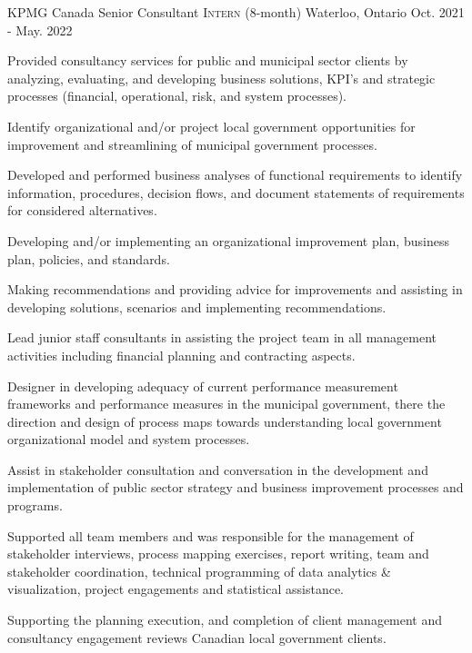 \begin{cventries}

  \cventry
    {KPMG Canada} %
    {Senior Consultant \textsc{Intern} (8-month)} %
    {Waterloo, Ontario } %
    {Oct. 2021 - May. 2022} %
    {
      \begin{cvitems} %
        \item Provided consultancy services for public and municipal sector clients by analyzing, evaluating, and developing business solutions, KPI’s and strategic processes (financial, operational, risk, and system processes).
        \item Identify organizational and/or project local government opportunities for improvement and streamlining of municipal government processes.
        \item Developed and performed business analyses of functional requirements to identify information, procedures, decision flows, and document statements of requirements for considered alternatives.
        \item Developing and/or implementing an organizational improvement plan, business plan, policies, and standards.
        \item Making recommendations and providing advice for improvements and assisting in developing solutions, scenarios and implementing recommendations.
        \item Lead junior staff consultants in assisting the project team in all management activities including financial planning and contracting aspects.
        \item Designer in developing adequacy of current performance measurement frameworks and performance measures in the municipal government, there the direction and design of process maps towards understanding local government organizational model and system processes.
        \item Assist in stakeholder consultation and conversation in the development and implementation of public sector strategy and business improvement processes and programs.
        \item Supported all team members and was responsible for the management of stakeholder interviews, process mapping exercises, report writing, team and stakeholder coordination, technical programming of data analytics \& visualization, project engagements and statistical assistance.
        \item Supporting the planning execution, and completion of client management and consultancy engagement reviews Canadian local government clients.

\end{cvitems}}
\end{cventries}
